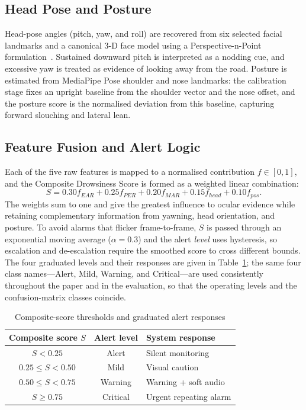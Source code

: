 \documentclass[conference]{IEEEtran}
\begin{document}
\subsection{Head Pose and Posture}
Head-pose angles (pitch, yaw, and roll) are recovered from six selected facial landmarks and a canonical 3-D face model using a Perspective-n-Point formulation~\cite{lepetit}. Sustained downward pitch is interpreted as a nodding cue, and excessive yaw is treated as evidence of looking away from the road. Posture is estimated from MediaPipe Pose shoulder and nose landmarks: the calibration stage fixes an upright baseline from the shoulder vector and the nose offset, and the posture score is the normalised deviation from this baseline, capturing forward slouching and lateral lean.

\subsection{Feature Fusion and Alert Logic}
Each of the five raw features is mapped to a normalised contribution $f\in[0,1]$, and the Composite Drowsiness Score is formed as a weighted linear combination:
\begin{equation}
S = 0.30f_{EAR}+0.25f_{PER}+0.20f_{MAR}+0.15f_{head}+0.10f_{pos}.
\end{equation}
The weights sum to one and give the greatest influence to ocular evidence while retaining complementary information from yawning, head orientation, and posture. To avoid alarms that flicker frame-to-frame, $S$ is passed through an exponential moving average ($\alpha=0.3$) and the alert \emph{level} uses hysteresis, so escalation and de-escalation require the smoothed score to cross different bounds. The four graduated levels and their responses are given in Table~\ref{tab:thresholds}; the same four class names---Alert, Mild, Warning, and Critical---are used consistently throughout the paper and in the evaluation, so that the operating levels and the confusion-matrix classes coincide.

\begin{table}[t]
\caption{Composite-score thresholds and graduated alert responses}
\label{tab:thresholds}
\centering
\begin{tabular}{ccl}
\toprule
Composite score $S$ & Alert level & System response\\
\midrule
$S<0.25$            & Alert    & Silent monitoring\\
$0.25\leq S<0.50$   & Mild     & Visual caution\\
$0.50\leq S<0.75$   & Warning  & Warning + soft audio\\
$S\geq0.75$         & Critical & Urgent repeating alarm\\
\bottomrule
\end{tabular}
\end{table}
\end{document}
